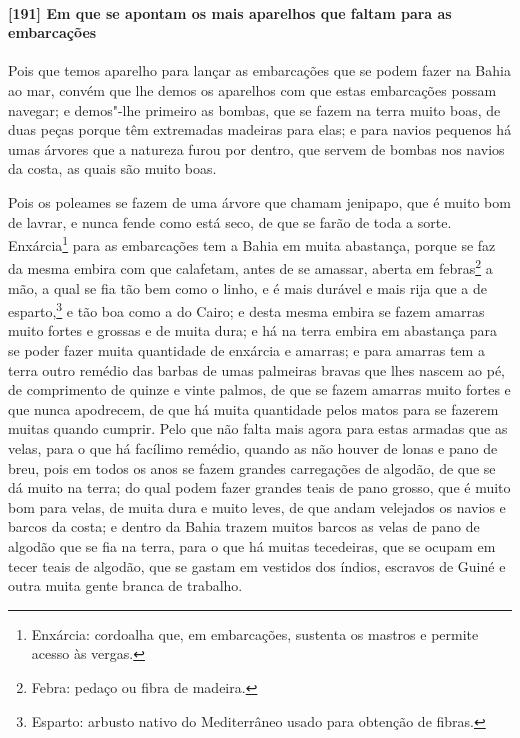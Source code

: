 \paragraph{[191] Em que se apontam os mais aparelhos que faltam para as embarcações}\quad
Pois que temos aparelho para lançar as embarcações que se podem fazer na Bahia ao mar,
convém que lhe demos os aparelhos com que estas embarcações possam navegar; e demos"-lhe
primeiro as bombas, que se fazem na terra muito boas, de duas peças porque têm extremadas
madeiras para elas; e para navios pequenos há umas árvores que a natureza furou por
dentro, que servem de bombas nos navios da costa, as quais são muito boas.

Pois os poleames se fazem de uma árvore que chamam jenipapo, que é muito bom de lavrar, e
nunca fende como está seco, de que se farão de toda a sorte. Enxárcia\footnote{ Enxárcia:
cordoalha que, em embarcações, sustenta os mastros e permite acesso às vergas.} para as
embarcações tem a Bahia em muita abastança, porque se faz da mesma embira com que
calafetam, antes de se amassar, aberta em febras\footnote{ Febra: pedaço ou fibra de
madeira.} a mão, a qual se fia tão bem como o linho, e é mais durável e mais rija que a de
esparto,\footnote{ Esparto: arbusto nativo do Mediterrâneo usado para obtenção de fibras.}
e tão boa como a do Cairo; e desta mesma embira se fazem amarras muito fortes e grossas e
de muita dura; e há na terra embira em abastança para se poder fazer muita quantidade de
enxárcia e amarras; e para amarras tem a terra outro remédio das barbas de umas palmeiras
bravas que lhes nascem ao pé, de comprimento de quinze e vinte palmos, de que se fazem
amarras muito fortes e que nunca apodrecem, de que há muita quantidade pelos matos para se
fazerem muitas quando cumprir. Pelo que não falta mais agora para estas armadas que as
velas, para o que há facílimo remédio, quando as não houver de lonas e pano de breu, pois
em todos os anos se fazem grandes carregações de algodão, de que se dá muito na terra; do
qual podem fazer grandes teais de pano grosso, que é muito bom para velas, de muita dura e
muito leves, de que andam velejados os navios e barcos da costa; e dentro da Bahia trazem
muitos barcos as velas de pano de algodão que se fia na terra, para o que há muitas
tecedeiras, que se ocupam em tecer teais de algodão, que se gastam em vestidos dos índios,
escravos de Guiné e outra muita gente branca de trabalho.

